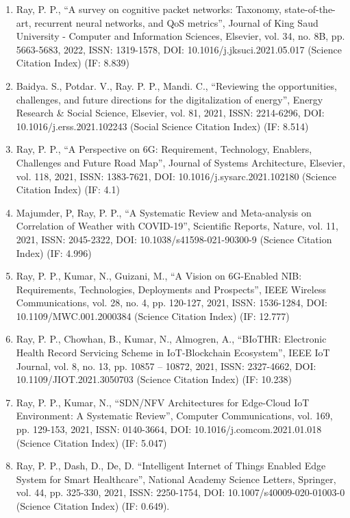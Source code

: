 \documentclass[11pt,a4paper]{moderncv}
\begin{document}
\begin{adjustwidth}{6em}{0pt}
\begin{enumerate}
		\item Ray, P. P., “A survey on cognitive packet networks: Taxonomy, state-of-the-art, recurrent neural networks, and QoS metrics”, Journal of King Saud University - Computer and Information Sciences, Elsevier, vol. 34, no. 8B, pp. 5663-5683, 2022, ISSN: 1319-1578, DOI: 10.1016/j.jksuci.2021.05.017 (Science Citation Index) (IF: 8.839) 
		
		\item Baidya. S., Potdar. V., Ray. P. P., Mandi. C., “Reviewing the opportunities, challenges, and future directions for the digitalization of energy”, Energy Research \& Social Science, Elsevier, vol. 81, 2021, ISSN: 2214-6296, DOI: 10.1016/j.erss.2021.102243 (Social Science Citation Index) (IF: 8.514) 
		
		\item Ray, P. P., “A Perspective on 6G: Requirement, Technology, Enablers, Challenges and Future Road Map”, Journal of Systems Architecture, Elsevier, vol. 118, 2021, ISSN: 1383-7621, DOI: 10.1016/j.sysarc.2021.102180 (Science Citation Index) (IF: 4.1)  
		
		\item Majumder, P, Ray, P. P., “A Systematic Review and Meta-analysis on Correlation of Weather with COVID-19”, Scientific Reports, Nature, vol. 11, 2021, ISSN: 2045-2322, DOI: 10.1038/s41598-021-90300-9 (Science Citation Index) (IF: 4.996) 
		
		\item Ray, P. P., Kumar, N., Guizani, M., “A Vision on 6G-Enabled NIB: Requirements, Technologies, Deployments and Prospects”, IEEE Wireless Communications, vol. 28, no. 4, pp. 120-127, 2021, ISSN: 1536-1284, DOI: 10.1109/MWC.001.2000384 (Science Citation Index) (IF: 12.777) 
		
		\item Ray, P. P., Chowhan, B., Kumar, N., Almogren, A., “BIoTHR: Electronic Health Record Servicing Scheme in IoT-Blockchain Ecosystem”, IEEE IoT Journal, vol. 8, no. 13, pp. 10857 – 10872, 2021, ISSN: 2327-4662, DOI: 10.1109/JIOT.2021.3050703 (Science Citation Index) (IF: 10.238)
		
		\item Ray, P. P., Kumar, N., “SDN/NFV Architectures for Edge-Cloud IoT Environment: A Systematic Review”, Computer Communications, vol. 169, pp. 129-153, 2021, ISSN: 0140-3664, DOI: 10.1016/j.comcom.2021.01.018 (Science Citation Index) (IF: 5.047)
		
		\item Ray, P. P., Dash, D., De, D. “Intelligent Internet of Things Enabled Edge System for Smart Healthcare”, National Academy Science Letters, Springer, vol. 44, pp. 325-330, 2021, ISSN: 2250-1754, DOI: 10.1007/s40009-020-01003-0 (Science Citation Index) (IF: 0.649).
		

\end{enumerate}
\end{adjustwidth}
\end{document}
